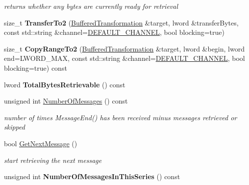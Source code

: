 \begin{DoxyCompactItemize}
\begin{DoxyCompactList}\small\item\em returns whether any bytes are currently ready for retrieval \item\end{DoxyCompactList}\item 
\hypertarget{class_message_queue_a7c20284d4b7c1c6bccc1e1cc8f275797}{
size\_\-t {\bfseries TransferTo2} (\hyperlink{class_buffered_transformation}{BufferedTransformation} \&target, lword \&transferBytes, const std::string \&channel=\hyperlink{cryptlib_8h_a6f1917f54ea8c2a45de6e08c5087c8de}{DEFAULT\_\-CHANNEL}, bool blocking=true)}
\label{class_message_queue_a7c20284d4b7c1c6bccc1e1cc8f275797}

\item 
\hypertarget{class_message_queue_a9627ad2234f41c59a3e5e8afedf569b5}{
size\_\-t {\bfseries CopyRangeTo2} (\hyperlink{class_buffered_transformation}{BufferedTransformation} \&target, lword \&begin, lword end=LWORD\_\-MAX, const std::string \&channel=\hyperlink{cryptlib_8h_a6f1917f54ea8c2a45de6e08c5087c8de}{DEFAULT\_\-CHANNEL}, bool blocking=true) const }
\label{class_message_queue_a9627ad2234f41c59a3e5e8afedf569b5}

\item 
\hypertarget{class_message_queue_a02288478f4582e38b46a0235c096dd12}{
lword {\bfseries TotalBytesRetrievable} () const }
\label{class_message_queue_a02288478f4582e38b46a0235c096dd12}

\item 
\hypertarget{class_message_queue_a00b443a9dd55d2b8c6e38b544dee189b}{
unsigned int \hyperlink{class_message_queue_a00b443a9dd55d2b8c6e38b544dee189b}{NumberOfMessages} () const }
\label{class_message_queue_a00b443a9dd55d2b8c6e38b544dee189b}

\begin{DoxyCompactList}\small\item\em number of times MessageEnd() has been received minus messages retrieved or skipped \item\end{DoxyCompactList}\item 
bool \hyperlink{class_message_queue_a540da279953a13541a65c271888e27b7}{GetNextMessage} ()
\begin{DoxyCompactList}\small\item\em start retrieving the next message \item\end{DoxyCompactList}\item 
\hypertarget{class_message_queue_a6705e6dc7fd0ca98d4d784e898d70c19}{
unsigned int {\bfseries NumberOfMessagesInThisSeries} () const }
\label{class_message_queue_a6705e6dc7fd0ca98d4d784e898d70c19}


\end{DoxyCompactItemize}
